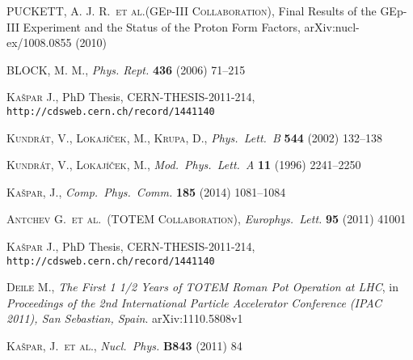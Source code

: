 \documentclass[pdftex,twocolumn,epjc3]{svjour3}
\def\etal{et al.}
\def\Name#1{\textsc{#1}, }
\def\REVIEW#1#2#3#4{{\it #1} {\bf #2} (#3) #4}
\begin{document}
\begin{thebibliography}{99}
	\Name{PUCKETT, A. J. R.~\etal{}(GEp-III Collaboration)}
	Final Results of the GEp-III Experiment and the Status of the Proton Form Factors,
	arXiv:nucl-ex/1008.0855 (2010)

	\Name{BLOCK, M. M.}
	\REVIEW{Phys. Rept.}{436}{2006}{71--215}

	\Name{Ka\v spar J.}
	PhD Thesis, CERN-THESIS-2011-214, {\tt http://cdsweb.cern.ch/record/1441140}

	\Name{Kundr\' at, V., Lokaj\' i\v cek, M., Krupa, D.}
	\REVIEW{Phys.~Lett.~B}{544}{2002}{132--138}

	\Name{Kundr\' at, V., Lokaj\' i\v cek, M.}
	\REVIEW{Mod.~Phys.~Lett.~A}{11}{1996}{2241--2250}

	\Name{Ka\v spar, J.}
	\REVIEW{Comp.~Phys.~Comm.}{185}{2014}{1081--1084}

\end{thebibliography}

\iffalse

	\Name{Antchev G.~\etal{}~(TOTEM Collaboration)}
	\REVIEW{Europhys.~Lett.}{95}{2011}{41001}


	\Name{Ka\v spar J.}
	PhD Thesis, CERN-THESIS-2011-214, {\tt http://cdsweb.cern.ch/record/1441140}

	\Name{Deile M.}
	{\it The First 1 1/2 Years of TOTEM Roman Pot Operation at LHC}, in
	{\it Proceedings of the 2nd International Particle Accelerator Conference (IPAC 2011), San Sebastian, Spain}. 
	arXiv:1110.5808v1

	\Name{Ka\v spar, J.~\etal}
	\REVIEW{Nucl.~Phys.}{B843}{2011}{84}
\end{document}
